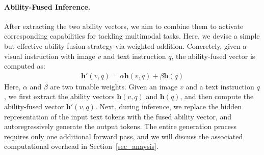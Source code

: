 \paragraph{Ability-Fused Inference.}
After extracting the two ability vectors, we aim to combine them to activate corresponding capabilities for tackling multimodal tasks. 
Here, we devise a simple but effective ability fusion strategy via weighted addition. 
Concretely, given a visual instruction with image $v$ and text instruction $q$, the ability-fused vector is computed as:
\begin{equation}
\begin{split}
    \bm{h'}(v, q)   = \alpha \bm{h}(v, q) +  \beta \bm{h}(q) 
\end{split}
\end{equation}
Here, $\alpha$ and $\beta$ are two tunable weights. 
Given an image $v$ and a text instruction $q$, we first extract the ability vectors $\bm{h}(v, q)$ and $\bm{h}(q)$, and then compute the ability-fused vector $\bm{h'}(v, q)$.
Next, during inference, we replace the hidden representation of the input text tokens with the fused ability vector, and autoregressively generate the output tokens.
The entire generation process requires only one additional forward pass, and we will discuss the associated computational overhead in Section~\ref{sec_anaysis}.









